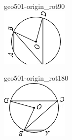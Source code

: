 \documentclass[12pt]{article}
\begin{document}
\begin{center}
\begin{minipage}{0.32\textwidth}
\end{minipage}
\hfill\begin{minipage}{0.32\textwidth}\centering
geo501-origin\_rot90\\
\includegraphics[width=0.95\linewidth]{out_rommath_origin/items/geo501-origin/assets/figure_rot90.png}
\end{minipage}
\par\medskip
\begin{minipage}{0.32\textwidth}\centering
geo501-origin\_rot180\\
\includegraphics[width=0.95\linewidth]{out_rommath_origin/items/geo501-origin/assets/figure_rot180.png}

\end{minipage}
\end{center}
\end{document}
